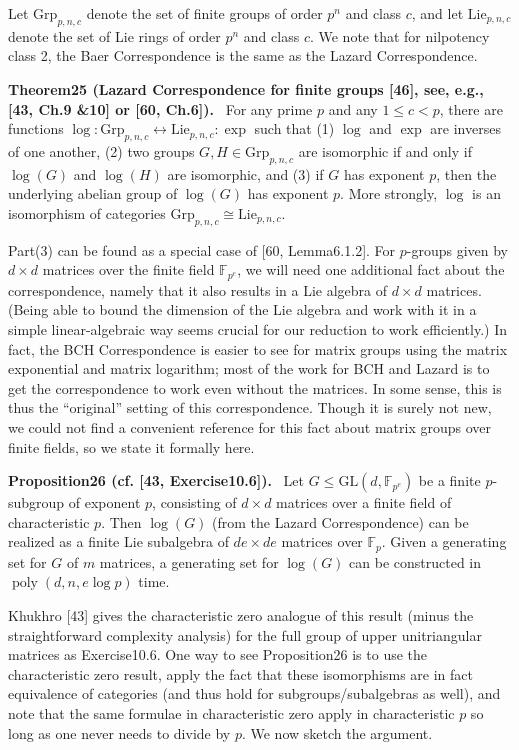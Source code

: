 \documentclass[10pt,a4paper]{article}
\newenvironment{authorclaim}[1]{\par\medskip\noindent\textbf{#1.}\ }{\par\medskip}
\begin{document}
Let $\mathrm{Grp}_{p,n,c}$ denote the set of finite groups of order $p^n$ and class $c$, and let $\mathrm{Lie}_{p,n,c}$ denote the set of Lie rings of order $p^n$ and class $c$. We note that for nilpotency class 2, the Baer Correspondence is the same as the Lazard Correspondence.
\begin{authorclaim}{Theorem25 (Lazard Correspondence for finite groups [46], see, e.g., [43, Ch.9 \&10] or [60, Ch.6])}
For any prime $p$ and any $1\le c<p$, there are functions $\log:\mathrm{Grp}_{p,n,c}\leftrightarrow\mathrm{Lie}_{p,n,c}:\exp$ such that (1) $\log$ and $\exp$ are inverses of one another, (2) two groups $G,H\in\mathrm{Grp}_{p,n,c}$ are isomorphic if and only if $\log(G)$ and $\log(H)$ are isomorphic, and (3) if $G$ has exponent $p$, then the underlying abelian group of $\log(G)$ has exponent $p$. More strongly, $\log$ is an isomorphism of categories $\mathrm{Grp}_{p,n,c}\cong\mathrm{Lie}_{p,n,c}$.
\end{authorclaim}
Part(3) can be found as a special case of [60, Lemma6.1.2].
For $p$-groups given by $d\times d$ matrices over the finite field $\mathbb F_{p^e}$, we will need one additional fact about the correspondence, namely that it also results in a Lie algebra of $d\times d$ matrices. (Being able to bound the dimension of the Lie algebra and work with it in a simple linear-algebraic way seems crucial for our reduction to work efficiently.) In fact, the BCH Correspondence is easier to see for matrix groups using the matrix exponential and matrix logarithm; most of the work for BCH and Lazard is to get the correspondence to work even without the matrices. In some sense, this is thus the ``original'' setting of this correspondence. Though it is surely not new, we could not find a convenient reference for this fact about matrix groups over finite fields, so we state it formally here.
\begin{authorclaim}{Proposition26 (cf. [43, Exercise10.6])}
Let $G\le\mathrm{GL}(d,\mathbb F_{p^e})$ be a finite $p$-subgroup of exponent $p$, consisting of $d\times d$ matrices over a finite field of characteristic $p$. Then $\log(G)$ (from the Lazard Correspondence) can be realized as a finite Lie subalgebra of $de\times de$ matrices over $\mathbb F_p$. Given a generating set for $G$ of $m$ matrices, a generating set for $\log(G)$ can be constructed in $\operatorname{poly}(d,n,e\log p)$ time.
\end{authorclaim}
Khukhro [43] gives the characteristic zero analogue of this result (minus the straightforward complexity analysis) for the full group of upper unitriangular matrices as Exercise10.6. One way to see Proposition26 is to use the characteristic zero result, apply the fact that these isomorphisms are in fact equivalence of categories (and thus hold for subgroups/subalgebras as well), and note that the same formulae in characteristic zero apply in characteristic $p$ so long as one never needs to divide by $p$. We now sketch the argument.
\end{document}
